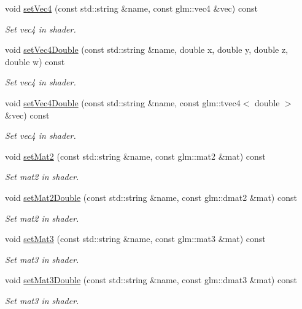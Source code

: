 \begin{DoxyCompactItemize}
void \hyperlink{class_shader_a261d7dcbb556622868fcd2ef2ba520a3}{set\+Vec4} (const std\+::string \&name, const glm\+::vec4 \&vec) const
\begin{DoxyCompactList}\small\item\em Set vec4 in shader. \end{DoxyCompactList}\item 
void \hyperlink{class_shader_a6b0094e3002405507e9a9c01e5ebdb83}{set\+Vec4\+Double} (const std\+::string \&name, double x, double y, double z, double w) const
\begin{DoxyCompactList}\small\item\em Set vec4 in shader. \end{DoxyCompactList}\item 
void \hyperlink{class_shader_a74fa00f4dde814257cbd252f27db538a}{set\+Vec4\+Double} (const std\+::string \&name, const glm\+::tvec4$<$ double $>$ \&vec) const
\begin{DoxyCompactList}\small\item\em Set vec4 in shader. \end{DoxyCompactList}\item 
void \hyperlink{class_shader_a91a6ee79b959cacd618c9e29a5bbd732}{set\+Mat2} (const std\+::string \&name, const glm\+::mat2 \&mat) const
\begin{DoxyCompactList}\small\item\em Set mat2 in shader. \end{DoxyCompactList}\item 
void \hyperlink{class_shader_a77695bb2f74b76cdd4b55b6d72cc2f64}{set\+Mat2\+Double} (const std\+::string \&name, const glm\+::dmat2 \&mat) const
\begin{DoxyCompactList}\small\item\em Set mat2 in shader. \end{DoxyCompactList}\item 
void \hyperlink{class_shader_a3e24fcad187493dfebaa12939072e91d}{set\+Mat3} (const std\+::string \&name, const glm\+::mat3 \&mat) const
\begin{DoxyCompactList}\small\item\em Set mat3 in shader. \end{DoxyCompactList}\item 
void \hyperlink{class_shader_af2f3db41877493ab4673225af922ee12}{set\+Mat3\+Double} (const std\+::string \&name, const glm\+::dmat3 \&mat) const
\begin{DoxyCompactList}\small\item\em Set mat3 in shader. \end{DoxyCompactList}\item 

\end{DoxyCompactItemize}
